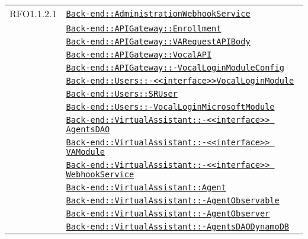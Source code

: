 \begin{longtable}{|>{\centering}m{3cm}|m{10cm}<{\centering}|}
RFO1.1.2.1 & \hyperref[Back-end::AdministrationWebhookService]{\texttt{Back-end::AdministrationWebhookService}}\\
& \hyperref[Back-end::APIGateway::Enrollment]{\texttt{Back-end::APIGateway::Enrollment}}\\
& \hyperref[Back-end::APIGateway::VARequestAPIBody]{\texttt{Back-end::APIGateway::VARequestAPIBody}}\\
& \hyperref[Back-end::APIGateway::VocalAPI]{\texttt{Back-end::APIGateway::VocalAPI}}\\
& \hyperref[Back-end::APIGateway::VocalLoginModuleConfig]{\texttt{Back-end::APIGateway::-\linebreak VocalLoginModuleConfig}}\\
& \hyperref[Back-end::Users::<<interface>>VocalLoginModule]{\texttt{Back-end::Users::-\linebreak <<interface>>VocalLoginModule}}\\
& \hyperref[Back-end::Users::SRUser]{\texttt{Back-end::Users::SRUser}}\\
& \hyperref[Back-end::Users::VocalLoginMicrosoftModule]{\texttt{Back-end::Users::-\linebreak VocalLoginMicrosoftModule}}\\
& \hyperref[Back-end::VirtualAssistant::<<interface>> AgentsDAO]{\texttt{Back-end::VirtualAssistant::-\linebreak <<interface>> AgentsDAO}}\\
& \hyperref[Back-end::VirtualAssistant::<<interface>> VAModule]{\texttt{Back-end::VirtualAssistant::-\linebreak <<interface>> VAModule}}\\
& \hyperref[Back-end::VirtualAssistant::<<interface>> WebhookService]{\texttt{Back-end::VirtualAssistant::-\linebreak <<interface>> WebhookService}}\\
& \hyperref[Back-end::VirtualAssistant::Agent]{\texttt{Back-end::VirtualAssistant::Agent}}\\
& \hyperref[Back-end::VirtualAssistant::AgentObservable]{\texttt{Back-end::VirtualAssistant::-\linebreak AgentObservable}}\\
& \hyperref[Back-end::VirtualAssistant::AgentObserver]{\texttt{Back-end::VirtualAssistant::-\linebreak AgentObserver}}\\
& \hyperref[Back-end::VirtualAssistant::AgentsDAODynamoDB]{\texttt{Back-end::VirtualAssistant::-\linebreak AgentsDAODynamoDB}}\\

\end{longtable}
